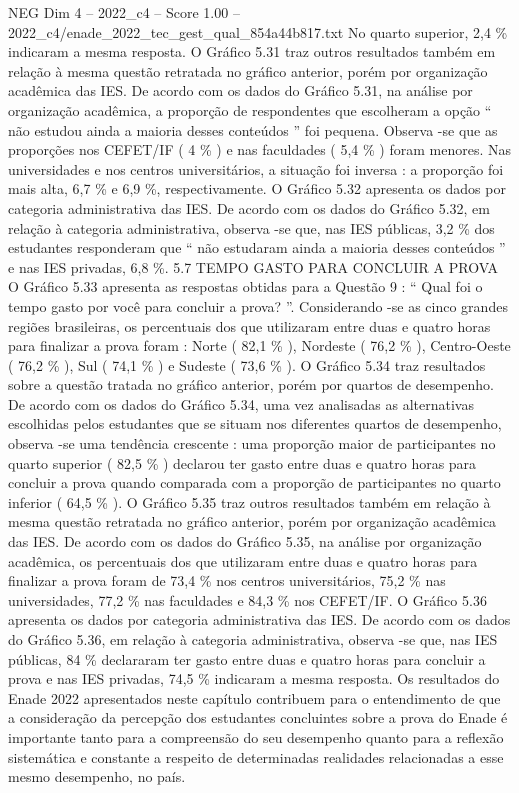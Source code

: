 \begin{textsample}{NEG Dim 4 – 2022\_c4 – Score 1.00 – 2022\_c4/enade\_2022\_tec\_gest\_qual\_854a44b817.txt}
No quarto superior, 2,4 \% indicaram a mesma resposta.
O Gráfico 5.31 traz outros resultados também em relação à mesma questão retratada no gráfico anterior, porém por organização acadêmica das IES.
De acordo com os dados do Gráfico 5.31, na análise por organização acadêmica, a proporção de respondentes que escolheram a opção “ não estudou ainda a maioria desses conteúdos ” foi pequena.
Observa -se que as proporções nos CEFET/IF ( 4 \% ) e nas faculdades ( 5,4 \% ) foram menores.
Nas universidades e nos centros universitários, a situação foi inversa : a proporção foi mais alta, 6,7 \% e 6,9 \%, respectivamente.
O Gráfico 5.32 apresenta os dados por categoria administrativa das IES.
De acordo com os dados do Gráfico 5.32, em relação à categoria administrativa, observa -se que, nas IES públicas, 3,2 \% dos estudantes responderam que “ não estudaram ainda a maioria desses conteúdos ” e nas IES privadas, 6,8 \%. 5.7 TEMPO GASTO PARA CONCLUIR A PROVA O Gráfico 5.33 apresenta as respostas obtidas para a Questão 9 : “ Qual foi o tempo gasto por você para concluir a prova? ”.
Considerando -se as cinco grandes regiões brasileiras, os percentuais dos que utilizaram entre duas e quatro horas para finalizar a prova foram : Norte ( 82,1 \% ), Nordeste ( 76,2 \% ), Centro-Oeste ( 76,2 \% ), Sul ( 74,1 \% ) e Sudeste ( 73,6 \% ).
O Gráfico 5.34 traz resultados sobre a questão tratada no gráfico anterior, porém por quartos de desempenho.
De acordo com os dados do Gráfico 5.34, uma vez analisadas as alternativas escolhidas pelos estudantes que se situam nos diferentes quartos de desempenho, observa -se uma tendência crescente : uma proporção maior de participantes no quarto superior ( 82,5 \% ) declarou ter gasto entre duas e quatro horas para concluir a prova quando comparada com a proporção de participantes no quarto inferior ( 64,5 \% ).
O Gráfico 5.35 traz outros resultados também em relação à mesma questão retratada no gráfico anterior, porém por organização acadêmica das IES.
De acordo com os dados do Gráfico 5.35, na análise por organização acadêmica, os percentuais dos que utilizaram entre duas e quatro horas para finalizar a prova foram de 73,4 \% nos centros universitários, 75,2 \% nas universidades, 77,2 \% nas faculdades e 84,3 \% nos CEFET/IF.
O Gráfico 5.36 apresenta os dados por categoria administrativa das IES.
De acordo com os dados do Gráfico 5.36, em relação à categoria administrativa, observa -se que, nas IES públicas, 84 \% declararam ter gasto entre duas e quatro horas para concluir a prova e nas IES privadas, 74,5 \% indicaram a mesma resposta.
Os resultados do Enade 2022 apresentados neste capítulo contribuem para o entendimento de que a consideração da percepção dos estudantes concluintes sobre a prova do Enade é importante tanto para a compreensão do seu desempenho quanto para a reflexão sistemática e constante a respeito de determinadas realidades relacionadas a esse mesmo desempenho, no país.

\end{textsample}
